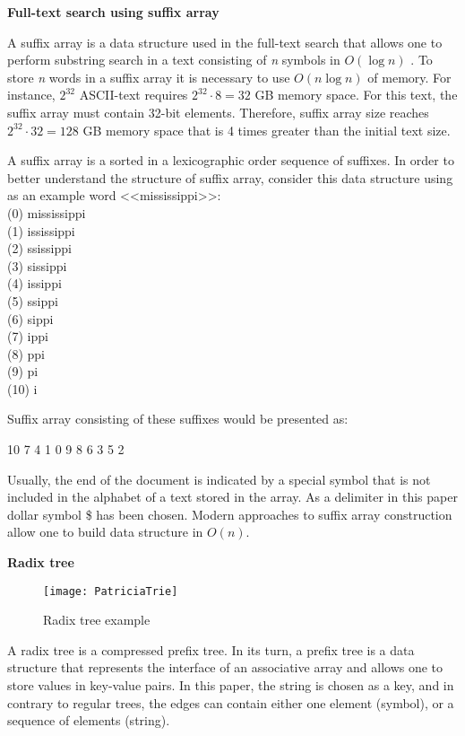 \textbf{Full-text search using suffix array}

A suffix array is a data structure used in the full-text search that allows one to perform
substring search in a text consisting of \emph{n} symbols in $O(\log{}n)$ \cite{manber1993suffix}.
To store \emph{n} words in a suffix array it is necessary to use $O(n \log{}n)$ of memory.
For instance, $2^{32}$ ASCII-text requires $2^{32} \cdot 8 = 32$ GB memory space.
For this text, the suffix array must contain 32-bit elements.
Therefore, suffix array size reaches $2^{32} \cdot 32 = 128$ GB memory space that is
4 times greater than the initial text size.

A suffix array is a sorted in a lexicographic order sequence of suffixes.
In order to better understand the structure of suffix array, consider this data structure
using as an example word <<mississippi>>:
\\(0) mississippi
\\(1) ississippi
\\(2) ssissippi
\\(3) sissippi
\\(4) issippi
\\(5) ssippi
\\(6) sippi
\\(7) ippi
\\(8) ppi
\\(9) pi
\\(10) i

Suffix array consisting of these suffixes would be presented as:

10 7 4 1 0 9 8 6 3 5 2

Usually, the end of the document is indicated by a special symbol that is not included in
the alphabet of a text stored in the array.
As a delimiter in this paper dollar symbol \$ has been chosen.
Modern approaches to suffix array construction allow one to build data structure in $O(n)$.

\textbf{Radix tree}


\begin{wrapfigure}{r}{0.25\textwidth} %
 \centering
 \texttt{[image: PatriciaTrie]}
 \caption{Radix tree example}
\end{wrapfigure}

A radix tree is a compressed prefix tree. In its turn, a prefix tree is a data structure
that represents the interface of an associative array and allows one to store values in key-value pairs.
In this paper, the string is chosen as a key, and in contrary to regular trees,
the edges can contain either one element (symbol), or a sequence of elements (string).

